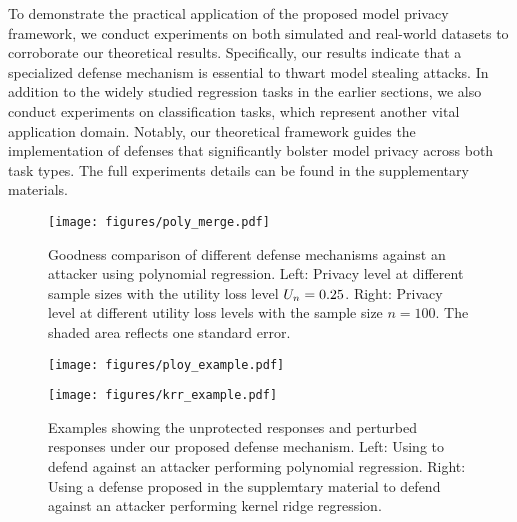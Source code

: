

To demonstrate the practical application of the proposed model privacy framework, we conduct experiments on both simulated and real-world datasets to corroborate our theoretical results. Specifically, our results indicate that a specialized defense mechanism is essential to thwart model stealing attacks. In addition to the widely studied regression tasks in the earlier sections, we also conduct experiments on classification tasks, which represent another vital application domain. Notably, our theoretical framework guides the implementation of defenses that significantly bolster model privacy across both task types. The full experiments details can be found in the supplementary materials.


\def\sigmoid{\textrm{softmax}}

    \begin{figure}[tb]
        \centering
        \texttt{[image: figures/poly\_merge.pdf]}
        \caption{Goodness comparison of different defense mechanisms against an attacker using polynomial regression. Left: Privacy level at different sample sizes with the utility loss level $U_n=0.25$.  Right: Privacy level at different utility loss levels with the sample size $n=100$. The shaded area reflects one standard error.}
        \label{fig:compare_defense}
    \end{figure}

        \begin{figure}[tb]
            \centering
                \begin{minipage}{0.48\linewidth}
                    \centering                        \texttt{[image: figures/ploy\_example.pdf]}
                \end{minipage}
                \hfill
                \begin{minipage}{0.48\linewidth}
                    \centering
                        \texttt{[image: figures/krr\_example.pdf]}
                \end{minipage}
            \caption{Examples showing the unprotected responses and perturbed responses under our proposed defense mechanism. Left: Using  to defend against an attacker performing polynomial regression. Right: Using a defense proposed in the supplemtary material to defend against an attacker performing kernel ridge regression. }
            \label{fig:defense_example}
        \end{figure}    
        
